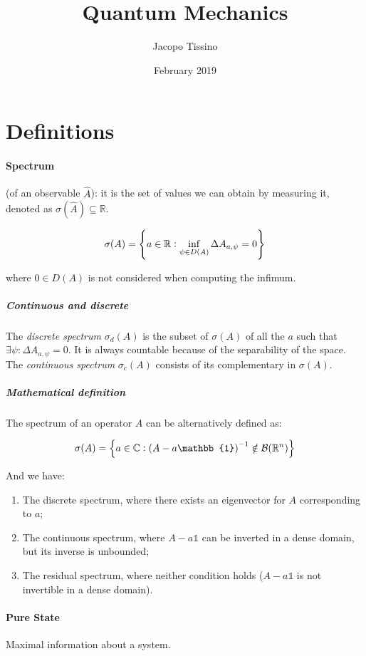 \documentclass{article}
\author{Jacopo Tissino}
\title{Quantum Mechanics}
\date{February 2019}
\begin{document}
\maketitle

\section{Definitions}

\paragraph{Spectrum} (of an observable $\hat{A}$): it is the set of values we can obtain by measuring it, denoted as $\sigma(\hat{A}) \subseteq \mathbb{R}$.

\begin{equation}
    \sigma(A) = \qty{
    a \in \mathbb{R}: \inf_{\psi \in D(A)} \Delta A_{a, \psi} = 0
    }
\end{equation}

where $0 \in D(A)$ is not considered when computing the infimum.

\subparagraph{Continuous and discrete} The \emph{discrete spectrum} $\sigma_d(A)$ is the subset of $\sigma (A)$ of all the $a$ such that $\exists \psi : \Delta A _{a, \psi} = 0$. It is always countable because of the separability of the space. The \emph{continuous spectrum} $\sigma_c(A)$ consists of its complementary in $\sigma(A)$.

\subparagraph{Mathematical definition} The spectrum of an operator $A$ can be alternatively defined as:

\begin{equation}
\sigma(A) = \qty{
a \in \mathbb{C}: \qty(A - a\mathbb{1})^{-1} \notin \mathcal{B}(\mathbb{R}^n)
}
\end{equation}

And we have:

\begin{enumerate}
    \item The discrete spectrum, where there exists an eigenvector for $A$ corresponding to $a$;
    \item The continuous spectrum, where $A-a\mathbb{1}$ can be inverted in a dense domain, but its inverse is unbounded;
    \item The residual spectrum, where neither condition holds ($A-a\mathbb{1}$ is not invertible in a dense domain).
\end{enumerate}

\paragraph{Pure State} Maximal information about a system.
\end{document}
